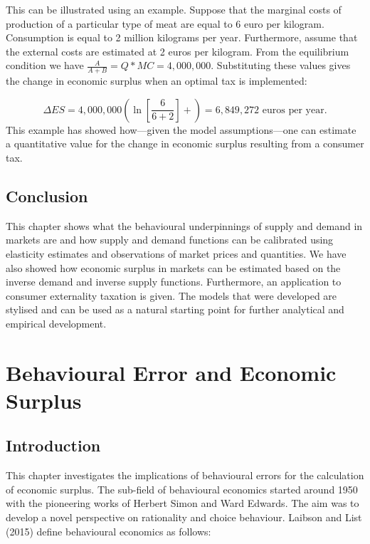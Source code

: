 \documentclass[
]{book}
\begin{document}
This can be illustrated using an example. Suppose that the marginal costs of production of a particular type of meat are equal to 6 euro per kilogram. Consumption is equal to 2 million kilograms per year. Furthermore, assume that the external costs are estimated at 2 euros per kilogram. From the equilibrium condition we have \(\frac{A}{A+B}=Q* MC=4,000,000\). Substituting these values gives the change in economic surplus when an optimal tax is implemented:

\begin{equation}
\Delta ES=4,000,000\left(\ln \left[\frac{6}{6+2} \right]+\right)=6,849,272 \text{ euros per year}.
\end{equation}
This example has showed how---given the model assumptions---one can estimate a quantitative value for the change in economic surplus resulting from a consumer tax.

\hypertarget{conclusion}{%
\section{Conclusion}\label{conclusion}}

This chapter shows what the behavioural underpinnings of supply and demand in markets are and how supply and demand functions can be calibrated using elasticity estimates and observations of market prices and quantities. We have also showed how economic surplus in markets can be estimated based on the inverse demand and inverse supply functions. Furthermore, an application to consumer externality taxation is given. The models that were developed are stylised and can be used as a natural starting point for further analytical and empirical development.

\hypertarget{erroreconsurplus}{%
\chapter{Behavioural Error and Economic Surplus}\label{erroreconsurplus}}

\hypertarget{introduction-4}{%
\section{Introduction}\label{introduction-4}}

This chapter investigates the implications of behavioural errors for the calculation of economic surplus. The sub-field of behavioural economics started around 1950 with the pioneering works of Herbert Simon and Ward Edwards. The aim was to develop a novel perspective on rationality and choice behaviour. Laibson and List (2015) define behavioural economics as follows:
\end{document}
